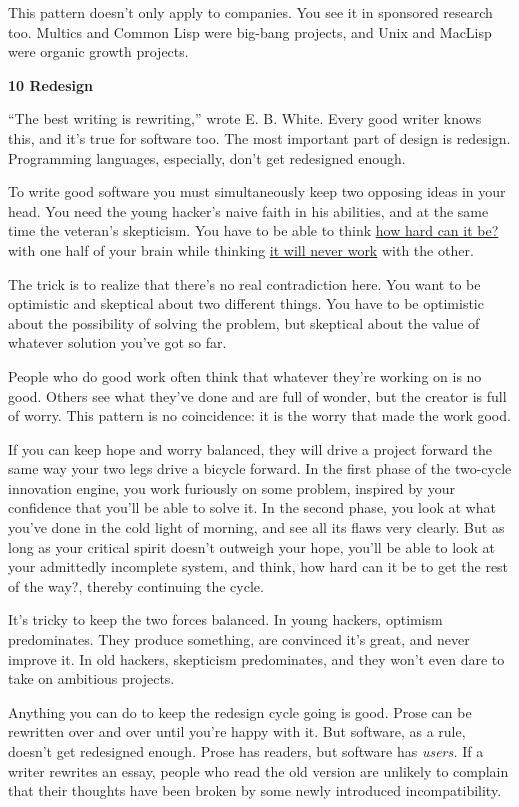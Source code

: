 This pattern doesn't only apply to companies. You see it in sponsored
research too. Multics and Common Lisp were big-bang projects, and Unix
and MacLisp were organic growth projects.

\textbf{10 Redesign}

``The best writing is rewriting,'' wrote E. B. White. Every good writer
knows this, and it's true for software too. The most important part of
design is redesign. Programming languages, especially, don't get
redesigned enough.

To write good software you must simultaneously keep two opposing ideas
in your head. You need the young hacker's naive faith in his abilities,
and at the same time the veteran's skepticism. You have to be able to
think \href{http://www.trevorblackwell.com}{how hard can it be?} with
one half of your brain while thinking
\href{http://www.pdos.lcs.mit.edu/~rtm/}{it will never work} with the
other.

The trick is to realize that there's no real contradiction here. You
want to be optimistic and skeptical about two different things. You have
to be optimistic about the possibility of solving the problem, but
skeptical about the value of whatever solution you've got so far.

People who do good work often think that whatever they're working on is
no good. Others see what they've done and are full of wonder, but the
creator is full of worry. This pattern is no coincidence: it is the
worry that made the work good.

If you can keep hope and worry balanced, they will drive a project
forward the same way your two legs drive a bicycle forward. In the first
phase of the two-cycle innovation engine, you work furiously on some
problem, inspired by your confidence that you'll be able to solve it. In
the second phase, you look at what you've done in the cold light of
morning, and see all its flaws very clearly. But as long as your
critical spirit doesn't outweigh your hope, you'll be able to look at
your admittedly incomplete system, and think, how hard can it be to get
the rest of the way?, thereby continuing the cycle.

It's tricky to keep the two forces balanced. In young hackers, optimism
predominates. They produce something, are convinced it's great, and
never improve it. In old hackers, skepticism predominates, and they
won't even dare to take on ambitious projects.

Anything you can do to keep the redesign cycle going is good. Prose can
be rewritten over and over until you're happy with it. But software, as
a rule, doesn't get redesigned enough. Prose has readers, but software
has \emph{users.} If a writer rewrites an essay, people who read the old
version are unlikely to complain that their thoughts have been broken by
some newly introduced incompatibility.

